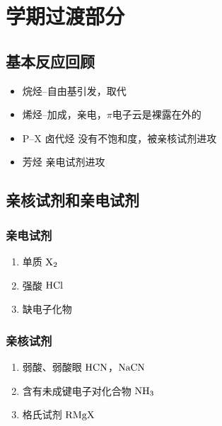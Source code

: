 \chapter*{学期过渡部分}
    \section*{基本反应回顾}
    \begin{itemize}
        \item 烷烃--自由基引发，取代
        \item 烯烃--加成，亲电，$\pi$电子云是裸露在外的
        \item P--X 卤代烃 没有不饱和度，被亲核试剂进攻
        \item 芳烃 亲电试剂进攻
    \end{itemize}

    \section*{亲核试剂和亲电试剂}
    
    \subsection*{亲电试剂}

    \begin{enumerate}
        \item 单质 $\ce{X2}$
        \item 强酸 $\ce{HCl}$
        \item 缺电子化物 
    \end{enumerate}

    \subsection*{亲核试剂}

    \begin{enumerate}
        \item 弱酸、弱酸眼 $\ce{HCN}$，$\ce{NaCN}$
        \item 含有未成键电子对化合物 $\ce{NH3}$
        \item 格氏试剂 $\ce{RMgX}$
    \end{enumerate}
